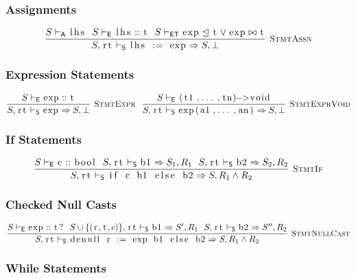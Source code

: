 \documentclass{article}
\newcommand{\code}[1]{\lstinline[columns=fixed]{#1}}
\newcommand{\drmrule}[5]{\frac{#1}{#2\vdash_{\mathsf{#3}}#4}\textsc{\ \small{#5}}}
\newcommand{\ruleapp}[1]{\vdash_{\mathsf{#1}}}
\newcommand{\mc}[1]{\textnormal{\code{#1}}}
\begin{document}
			\subsubsection{Assignments}
			
				\begin{align*}
					\drmrule{S\ruleapp{A}\mc{lhs}\ \ S\ruleapp{E}\mc{lhs} :: \mc{t}\ \ S\ruleapp{ET}\mc{exp} \trianglelefteq \mc{t} \vee \mc{exp}\bowtie\mc{t}}{S,\mc{rt}}{S}{\mc{lhs := exp} \Rightarrow S,\bot}{StmtAssn}
				\end{align*}
			
			\subsubsection{Expression Statements}
			
				\begin{align*}
					\drmrule{S\ruleapp{E}\mc{exp} :: \mc{t}}{S,\mc{rt}}{S}{\mc{exp} \Rightarrow S,\bot}{StmtExpr}\ \ \drmrule{S\ruleapp{E}\mc{(t1,...,tn)->void}}{S,\mc{rt}}{S}{\mc{exp(a1,...,an)} \Rightarrow S,\bot}{StmtExprVoid}
				\end{align*}
			
			\subsubsection{If Statements}
			
				\begin{align*}
					\drmrule{S\ruleapp{E}\mc{c} :: \mc{bool}\ \ S,\mc{rt}\ruleapp{S}\mc{b1}\Rightarrow S_1,R_1\ \ S,\mc{rt}\ruleapp{S}\mc{b2}\Rightarrow S_2,R_2}{S,\mc{rt}}{S}{\mc{if c b1 else b2} \Rightarrow S,R_1\wedge R_2}{StmtIf}
				\end{align*}
				
			\subsubsection{Checked Null Casts}
			
				\begin{align*}
					\drmrule{S\ruleapp{E}\mc{exp}::\mc{t?}\ \ S\cup\{(\mc{r},\mc{t},c)\},\mc{rt} \ruleapp{S} \mc{b1} \Rightarrow S',R_1\ \ S,\mc{rt} \ruleapp{S}\mc{b2}\Rightarrow S'',R_2}{S,\mc{rt}}{S}{\mc{denull r := exp b1 else b2} \Rightarrow S,R_1\wedge R_2}{StmtNullCast}
				\end{align*}
			
			\subsubsection{While Statements}
			
\end{document}
